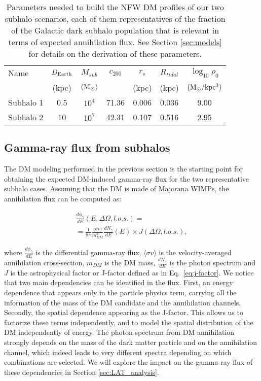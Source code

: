 \documentclass[%
 reprint,
nofootinbib,
 amsmath,amssymb,
 aps,
]{revtex4-2}
\begin{document}
\begin{table}[ht!]
\caption{Parameters needed to build the NFW DM profiles of our two subhalo scenarios, each of them representatives of the fraction of the Galactic dark subhalo population that is relevant in terms of expected annihilation flux. See Section \ref{sec:models} for details on the derivation of these parameters.}
\centering
\begin{tabular}{  l | c | c | c | c | c | c }
\hline
\hline
Name & $D_{\rm Earth}$ & $M_{sub}$ & $c_{200}$ & $r_s$ & $R_{tidal}$ & $\log_{10}\rho_0$ \\
 & (kpc) & $\rm (M_{\odot})$ &  & (kpc) & (kpc) & $\rm (M_{\odot}/kpc^3)$ \\
\hline
Subhalo 1 & 0.5 & $10^4$ & 71.36 & 0.006 & 0.036 & 9.00 \\
Subhalo 2 & 10 & $10^7$ & 42.31 & 0.107 & 0.516 & 2.95 \\ 
\hline
\hline
\end{tabular}
\label{tab:parameters_nfw}
\end{table}

\subsection{Gamma-ray flux from subhalos}\label{sec:j-factors}
The DM modeling performed in the previous section is the starting point for obtaining the expected DM-induced gamma-ray flux for the two representative subhalo cases. Assuming that the DM is made of Majorana WIMPs, the annihilation flux can be computed as: 

\begin{equation}\label{eq:dm-flux}
\begin{split}
\frac{d\phi_{\gamma}}{dE}(E, \Delta\Omega, l.o.s.)=\\=\frac{1}{8\pi}\frac{\langle\sigma v\rangle}{ m^2_{DM}}\frac{dN_{\gamma}}{dE}(E)\times J(\Delta\Omega, l.o.s.),
\end{split}
\end{equation}

\noindent where $\frac{d\phi_{\gamma}}{dE}$ is the differential gamma-ray flux, $\langle\sigma v\rangle$ is the velocity-averaged annihilation cross-section, $m_{DM}$ is the DM mass, $\frac{dN_{\gamma}}{dE}$ is the photon spectrum and $J$ is the astrophysical factor or J-factor defined as in Eq.~\ref{eq:j-factor}. We notice that two main dependencies can be identified in the flux. First, an energy dependence that appears only in the particle physics term, carrying all the information of the mass of the DM candidate and the annihilation channels. Secondly, the spatial dependence appearing as the J-factor. This allows us to factorize these terms independently, and to model the spatial distribution of the DM independently of energy. The photon spectrum from DM annihilation strongly depends on the mass of the dark matter particle and on the annihilation channel, which indeed leads to very different spectra depending on which combinations are selected. We will explore the impact on the gamma-ray flux of these dependencies in Section \ref{sec:LAT_analysis}.
\end{document}
